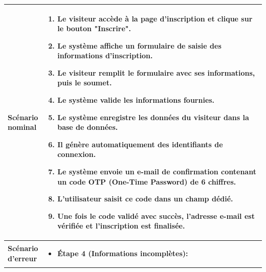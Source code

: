\begin{enumerate}[label=\alph*), left=-0.1cm]
\begin{itemize}[label=, left=-0.1cm]
\begin{spacing}{1.1}
\begin{longtable}{|p{0.12\linewidth}|p{0.88\linewidth}|}
                            \hline
                            \textbf{Scénario nominal} & 
                            \begin{minipage}{\linewidth}
                                \vspace{0.1cm}
                                \begin{enumerate}[label=\arabic*., left=-0.05cm]
                                    \item Le visiteur accède à la page d'inscription et clique sur le bouton "Inscrire".
                                    \item Le système affiche un formulaire de saisie des informations d'inscription.
                                    \item Le visiteur remplit le formulaire avec ses informations, puis le soumet.
                                    \item Le système valide les informations fournies.
                                    \item Le système enregistre les données du visiteur dans la base de données.
                                    \item Il génère automatiquement des identifiants de connexion.
                                    \item Le système envoie un e-mail de confirmation contenant un code OTP (One-Time Password) de 6 chiffres.
                                    \item L'utilisateur saisit ce code dans un champ dédié.
                                    \item Une fois le code validé avec succès, l'adresse e-mail est vérifiée et l'inscription est finalisée.
                                \end{enumerate}
                                \vspace{0.05cm}
                            \end{minipage}\\
                            \hline
                            \textbf{Scénario d’erreur} &
                            \begin{minipage}{\linewidth}
                                \vspace{0.1cm}
                                \begin{itemize}[left=0cm]
                                    \item[\textbullet] \textbf{Étape 4 (Informations incomplètes):}

\end{itemize}
\end{minipage}
\end{longtable}
\end{spacing}
\end{itemize}
\end{enumerate}
